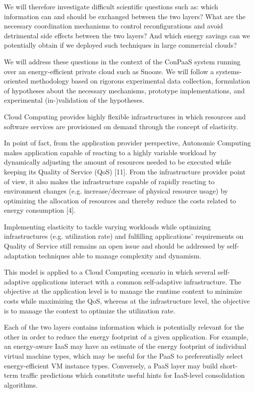 We will therefore investigate difficult scientific questions such as: which information can and should be exchanged between the two layers? What are the necessary coordination mechanisms to control reconfigurations and avoid detrimental side effects between the two layers? And which energy savings can we potentially obtain if we deployed such techniques in large commercial clouds?

We will address these questions in the context of the ConPaaS system running over an energy-efficient private cloud such as Snooze. We will follow a systems-oriented methodology based on rigorous experimental data collection, formulation of hypotheses about the necessary mechanisms, prototype implementations, and experimental (in-)validation of the hypotheses.

Cloud Computing provides highly flexible infrastructures in which resources and software services are provisioned on demand through the concept of elasticity.


In point of fact, from the application provider perspective, Autonomic Computing makes application capable of reacting to a highly variable workload by dynamically adjusting the amount of resources needed to be executed while keeping its Quality of Service (QoS) [11]. From the infrastructure provider point of view, it also makes the infrastructure capable of rapidly reacting to environment changes (e.g. increase/decrease of physical resource usage) by optimizing the allocation of resources and thereby reduce the costs related to energy consumption [4].

Implementing elasticity to tackle varying workloads while optimizing infrastructures (e.g. utilization rate) and fulfilling applications’ requirements on Quality of Service still remains an open issue and should be addressed by self-adaptation techniques able to manage complexity and dynamism. 

This model is applied to a Cloud Computing scenario in which several self-adaptive applications interact with a common self-adaptive infrastructure. The objective at the application level is to manage the runtime context to minimize costs while maximizing the QoS, whereas at the infrastructure level, the objective is to manage the context to optimize the utilization rate. 




Each of the two layers contains information which is potentially relevant for the other in order to reduce the energy footprint of a given application. For example, an energy-aware IaaS may have an estimate of the energy footprint of individual virtual machine types, which may be useful for the PaaS to preferentially select energy-efficient VM instance types. Conversely, a PaaS layer may build short-term traffic predictions which constitute useful hints for IaaS-level consolidation algorithms.

